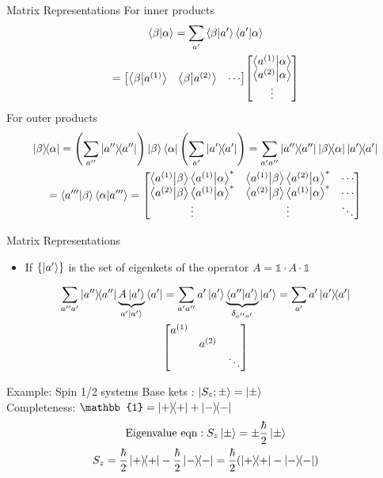\begin{frame}{Matrix Representations}
	For inner products
	\begin{gather*}
		\ip{\beta}{\alpha} = \sum_{a'} \ip{\beta}{a'}\ip{a'}{\alpha} \\
		= \mqty[ \ip{\beta}{a^{(1)}} & \ip{\beta}{a^{(2)}} & \cdots]
		\mqty[ \ip{a^{(1)}}{\alpha} \\
			\ip{a^{(2)}}{\alpha} \\
			\vdots]
		\\
	\end{gather*}
	For outer products
	\begin{gather*}
		\op{\beta}{\alpha} = \qty(\sum_{a''} \op{a''}) \ket\beta \bra{\alpha} \qty(\sum_{a'} \op{a'})=\sum_{a' a''} \op{a''}\op{\beta}{\alpha} \op{a'} \\
		= \ip{a'''}{\beta} \ip{\alpha}{a'''} = \mqty[
			\ip{a^{(1)}}{\beta}\ip{a^{(1)}}{\alpha}^* & \ip{a^{(1)}}{\beta}\ip{a^{(2)}}{\alpha}^* & \cdots \\
			\ip{a^{(2)}}{\beta}\ip{a^{(1)}}{\alpha}^* & \ip{a^{(2)}}{\beta}\ip{a^{(1)}}{\alpha}^* & \cdots \\
			\vdots & \vdots & \ddots
		]
	\end{gather*}
\end{frame}

\begin{frame}{Matrix Representations}
	\begin{itemize}
		\item If $\{\ket{a'}\}$ is the set of eigenkets of the operator $A = \mathbb{1}\cdot A \cdot \mathbb{1}$
	\end{itemize}
	\begin{gather*}
		\sum_{a'' a'} \op{a''} \underbrace{A\ket{a'}}_{a'\ket{a'}}\bra{a'} = \sum_{a' a''} a'\ket{a'}\underbrace{\ip{a''}{a'}}_{\delta_{a'' a'}} \ket{a'} = \sum_{a'} a'\op{a'}\\
		\mqty[\dmat{ a^{(1)},a^{(2)},\ddots }]
	\end{gather*}
\end{frame}

\begin{frame}{Example: Spin 1/2 systems}
	Base kets : $ \ket{S_z;\pm} = \ket{\pm}$\\
	Completeness: $\mathbb{1} = \op{+} + \op{-}$
	\begin{gather*}
		\text{Eigenvalue eqn}: S_z \ket{\pm} = \pm \frac\hbar2 \ket{\pm}\\
		S_z = \frac\hbar2 \op{+} - \frac{\hbar}{2}\op{-} = \frac{\hbar}{2} \qty(\op{+} - \op{-})
	\end{gather*}
\end{frame}

